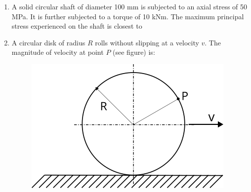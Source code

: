 \documentclass[journal,12pt,onecolumn]{IEEEtran}
\begin{document}
\begin{enumerate}[resume]
    \item A solid circular shaft of diameter 100 mm is subjected to an axial stress of 50 MPa. It is further subjected to a torque of 10 kNm. The maximum principal stress experienced on the shaft is closest to
          \begin{enumerate}
          \end{enumerate}

    \item A circular disk of radius $R$ rolls without slipping at a velocity $v$. The magnitude of velocity at point $P$ (see figure) is:
          \begin{figure}[H]
              \centering
              \includegraphics[scale=0.7]{q33}
              \caption{}
              \label{q33}
          \end{figure}

          \begin{enumerate}
          \end{enumerate}


\end{enumerate}
\end{document}
